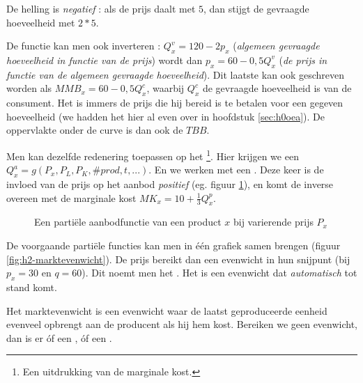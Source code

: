De helling is \textit{negatief} : als de prijs daalt met $5$, dan stijgt de gevraagde hoeveelheid met $2*5$.
\par De functie kan men ook inverteren : $Q_x^v=120-2p_x$ (\textit{algemeen gevraagde hoeveelheid in functie van de prijs}) wordt dan $p_x=60-0,5Q_x^v$ (\textit{de prijs in functie van de algemeen gevraagde hoeveelheid}). Dit laatste kan ook geschreven worden als $MMB_x=60-0,5Q_x^c$, waarbij $Q_x^c$ de gevraagde hoeveelheid is van de consument. Het is immers de prijs die hij bereid is te betalen voor een gegeven hoeveelheid (we hadden het hier al even over in hoofdstuk \ref{sec:h0oea}). De oppervlakte onder de curve is dan ook de  $TBB$. \\

\par Men kan dezelfde redenering toepassen op het \footnote{Een uitdrukking van de marginale kost.}. Hier krijgen we een  $Q_x^a=g(P_x,P_L,P_K,\# prod,t,...)$. En we werken met een . Deze keer is de invloed van de prijs op het aanbod \textit{positief} (eg. figuur \ref{fig:h2-aanbodfunctie}), en komt de inverse overeen met de marginale kost $MK_x=10+\frac{1}{3}Q_x^p$.\\

\begin{figure}[H]
\vspace{0.5cm}
\centering\small
\captionsetup{justification=centering,margin=2cm}
\caption{Een parti\"ele aanbodfunctie van een product $x$ bij varierende prijs $P_x$}
\label{fig:h2-aanbodfunctie}
\end{figure}

\par De voorgaande parti\"ele functies kan men in \'e\'en grafiek samen brengen (figuur \ref{fig:h2-marktevenwicht}). De prijs bereikt dan een evenwicht in hun snijpunt (bij $p_x=30$ en $q=60$). Dit noemt men het . Het is een evenwicht dat \textit{automatisch} tot stand komt.
\par Het marktevenwicht is een evenwicht waar de laatst geproduceerde eenheid evenveel opbrengt aan de producent als hij hem kost. Bereiken we geen evenwicht, dan is er \'of een , \'of een .

